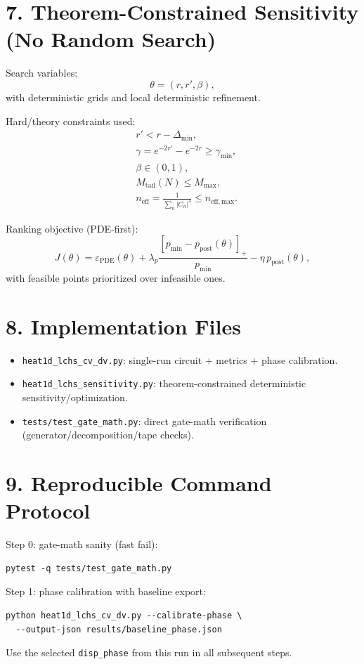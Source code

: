 \documentclass[11pt]{article}
\begin{document}
\section*{7. Theorem-Constrained Sensitivity (No Random Search)}
Search variables:
\begin{equation}
\theta=(r,r',\beta),
\end{equation}
with deterministic grids and local deterministic refinement.

Hard/theory constraints used:
\begin{align}
&r'<r-\Delta_{\min},\\
&\gamma=e^{-2r'}-e^{-2r}\ge \gamma_{\min},\\
&\beta\in(0,1),\\
&M_{\mathrm{tail}}(N)\le M_{\max},\\
&n_{\mathrm{eff}}=\frac{1}{\sum_n|C_n|^4}\le n_{\mathrm{eff,max}}.
\end{align}

Ranking objective (PDE-first):
\begin{equation}
J(\theta)=\varepsilon_{\mathrm{PDE}}(\theta)
+\lambda_p\frac{[p_{\min}-p_{\mathrm{post}}(\theta)]_+}{p_{\min}}
-\eta\,p_{\mathrm{post}}(\theta),
\end{equation}
with feasible points prioritized over infeasible ones.

\section*{8. Implementation Files}
\begin{itemize}
\item \texttt{heat1d\_lchs\_cv\_dv.py}: single-run circuit + metrics + phase calibration.
\item \texttt{heat1d\_lchs\_sensitivity.py}: theorem-constrained deterministic sensitivity/optimization.
\item \texttt{tests/test\_gate\_math.py}: direct gate-math verification (generator/decomposition/tape checks).
\end{itemize}

\section*{9. Reproducible Command Protocol}
Step 0: gate-math sanity (fast fail):
\begin{verbatim}
pytest -q tests/test_gate_math.py
\end{verbatim}

Step 1: phase calibration with baseline export:
\begin{verbatim}
python heat1d_lchs_cv_dv.py --calibrate-phase \
  --output-json results/baseline_phase.json
\end{verbatim}
Use the selected \texttt{disp\_phase} from this run in all subsequent steps.
\end{document}
